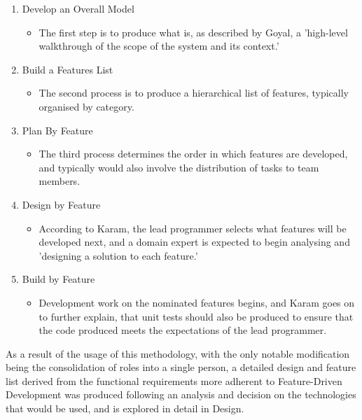 \begin{enumerate}
    \item Develop an Overall Model
    \begin{itemize}
        \item The first step is to produce what is, as described by Goyal, a 'high-level walkthrough of the scope of the system and its context.' \cite{Goyal1}
    \end{itemize}
    \item Build a Features List
    \begin{itemize}
        \item The second process is to produce a hierarchical list of features, typically organised by category. \cite{Goyal1}
    \end{itemize}
    \item Plan By Feature
    \begin{itemize}
        \item The third process determines the order in which features are developed, and typically would also involve the distribution of tasks to team members. \cite{Goyal1}
    \end{itemize}
    \item Design by Feature
    \begin{itemize}
        \item According to Karam, the lead programmer selects what features will be developed next, and a domain expert is expected to begin analysing and 'designing a solution to each feature.' \cite{Karam1}
    \end{itemize}
    \item Build by Feature
    \begin{itemize}
        \item Development work on the nominated features begins, and Karam goes on to further explain, that unit tests should also be produced to ensure that the code produced meets the expectations of the lead programmer. \cite{Karam1}
    \end{itemize}
\end{enumerate}

As a result of the usage of this methodology, with the only notable modification being the consolidation of roles into a single person, a detailed design and feature list derived from the functional requirements more adherent to Feature-Driven Development was produced following an analysis and decision on the technologies that would be used, and is explored in detail in Design.

